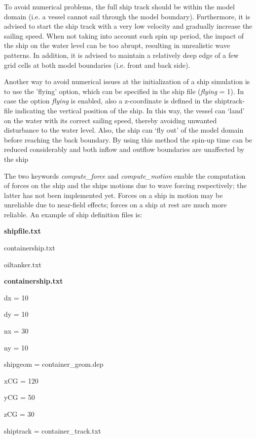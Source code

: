 \documentclass{article}
\begin{document}
\noindent To avoid numerical problems, the full ship track should be within the model domain (i.e. a vessel cannot sail through the model boundary). Furthermore, it is advised to start the ship track with a very low velocity and gradually increase the sailing speed. When not taking into account such spin up period, the impact of the ship on the water level can be too abrupt, resulting in unrealistic wave patterns. In addition, it is advised to maintain a relatively deep edge of a few grid cells at both model boundaries (i.e. front and back side).

\noindent Another way to avoid numerical issues at the initialization of a ship simulation is to use the 'flying' option, which can be specified in the ship file (\textit{flying }= 1). In case the option \textit{flying} is enabled, also a z-coordinate is defined in the shiptrack-file indicating the vertical position of the ship. In this way, the vessel can `land' on the water with its correct sailing speed, thereby avoiding unwanted disturbance to the water level. Also, the ship can `fly out' of the model domain before reaching the back boundary. By using this method the spin-up time can be reduced considerably and both inflow and outflow boundaries are unaffected by the ship

\noindent The two keywords\textit{ compute\_force} and\textit{ compute\_motion }enable the computation of forces on the ship and the ships motions due to wave forcing respectively; the latter has not been implemented yet. Forces on a ship in motion may be unreliable due to near-field effects; forces on a ship at rest are much more reliable. An example of ship definition files is:

\noindent \textbf{shipfile.txt}

\noindent containership.txt

\noindent oiltanker.txt

\noindent \textbf{containership.txt}

\noindent dx = 10

\noindent dy = 10

\noindent nx = 30

\noindent ny = 10

\noindent shipgeom = container\_geom.dep

\noindent xCG = 120

\noindent yCG = 50

\noindent zCG = 30

\noindent shiptrack = container\_track.txt
\end{document}
